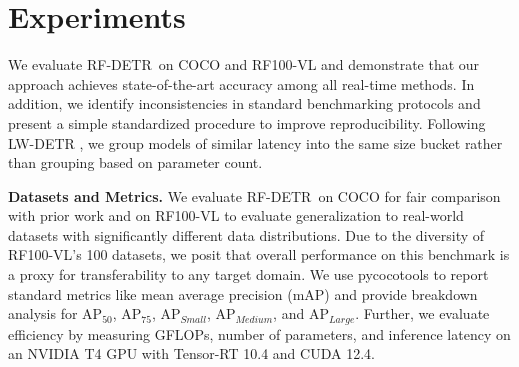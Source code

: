 \documentclass{article} %
\newcommand\peter[1]{\textcolor{blue}{[Peter: #1]}}
\newcommand{\method}{RF-DETR}
\begin{document}
\section{Experiments}
We evaluate \method \ on COCO and RF100-VL and demonstrate that our approach achieves state-of-the-art accuracy among all real-time methods. In addition, we identify inconsistencies in standard benchmarking protocols and present a simple standardized procedure to improve reproducibility. Following LW-DETR \citep{chen2024lw}, we group models of similar latency into the same size bucket rather than grouping based on parameter count.

\textbf{Datasets and Metrics.} We evaluate \method \ on COCO for fair comparison with prior work and on RF100-VL to evaluate generalization to real-world datasets with significantly different data distributions. Due to the diversity of RF100-VL's 100 datasets, we posit that overall performance on this benchmark is a proxy for transferability to any target domain. We use pycocotools to report standard metrics like mean average precision (mAP) and provide breakdown analysis for AP$_{50}$, AP$_{75}$, AP$_{Small}$, AP$_{Medium}$, and AP$_{Large}$. Further, we evaluate efficiency by measuring GFLOPs, number of parameters, and inference latency on an NVIDIA T4 GPU with Tensor-RT 10.4 and CUDA 12.4. 
\end{document}

